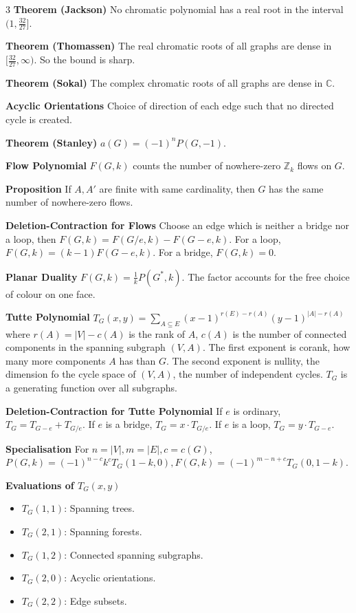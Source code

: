 \documentclass[10pt, landscape]{article}
\begin{document}
\begin{multicols*}{3}
\textbf{Theorem (Jackson)} No chromatic polynomial has a real root in the interval $(1, \frac{32}{27}]$.

\textbf{Theorem (Thomassen)} The real chromatic roots of all graphs are dense in $[\frac{32}{27}, \infty)$. So the bound is sharp.

\textbf{Theorem (Sokal)} The complex chromatic roots of all graphs are dense in $\mathbb{C}$.

\textbf{Acyclic Orientations} Choice of direction of each edge such that no directed cycle is created.

\textbf{Theorem (Stanley)} $a(G)=(-1)^nP(G, -1)$.

\textbf{Flow Polynomial} $F(G,k)$ counts the number of nowhere-zero $\mathbb{Z}_k$ flows on $G$.

\textbf{Proposition} If $A, A'$ are finite with same cardinality, then $G$ has the same number of nowhere-zero flows.

\textbf{Deletion-Contraction for Flows} Choose an edge which is neither a bridge nor a loop, then $F(G,k)=F(G/e, k)-F(G-e,k)$. For a loop, $F(G,k)=(k-1)F(G-e,k)$. For a bridge, $F(G,k)=0$.

\textbf{Planar Duality} $F(G,k)=\frac{1}{k}P(G^*, k)$. The factor accounts for the free choice of colour on one face.

\textbf{Tutte Polynomial} $T_G(x, y)=\sum_{A \subseteq E} (x-1)^{r(E)-r(A)}(y-1)^{|A|-r(A)}$ where $r(A)=|V|-c(A)$ is the rank of $A$, $c(A)$ is the number of connected components in the spanning subgraph $(V,A)$. The first exponent is corank, how many more components $A$ has than $G$. The second exponent is nullity, the dimension fo the cycle space of $(V,A)$, the number of independent cycles. $T_G$ is a generating function over all subgraphs.

\textbf{Deletion-Contraction for Tutte Polynomial} If $e$ is ordinary, $T_G=T_{G-e}+T_{G/e}$. If $e$ is a bridge, $T_G=x \cdot T_{G/e}$. If $e$ is a loop, $T_G=y \cdot T_{G-e}$.

\textbf{Specialisation} For $n=|V|, m=|E|, c=c(G)$, $P(G,k)=(-1)^{n-c}k^c T_G(1-k, 0), F(G,k)=(-1)^{m-n+c}T_G(0, 1-k)$.

\textbf{Evaluations of $T_G(x, y)$} 
\begin{itemize}
    \item $T_G(1,1)$: Spanning trees.
    \item $T_G(2,1)$: Spanning forests.
    \item $T_G(1,2)$: Connected spanning subgraphs.
    \item $T_G(2,0)$: Acyclic orientations.
    \item $T_G(2,2)$: Edge subsets.
\end{itemize}


\end{multicols*}
\end{document}
